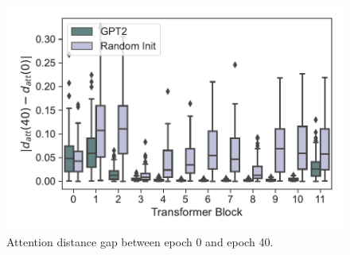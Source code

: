 \documentclass{article}
\begin{document}
\begin{figure}[H]
\begin{minipage}[b]{0.32\linewidth}
        \includegraphics[width=\linewidth]{figs/att_dist_diff_0_40_gpt2_dt_walker2d_medium_666_K1.pdf}
    \end{minipage}
    \caption{Attention distance gap between epoch 0 and epoch 40.}
\end{figure}
\end{document}
